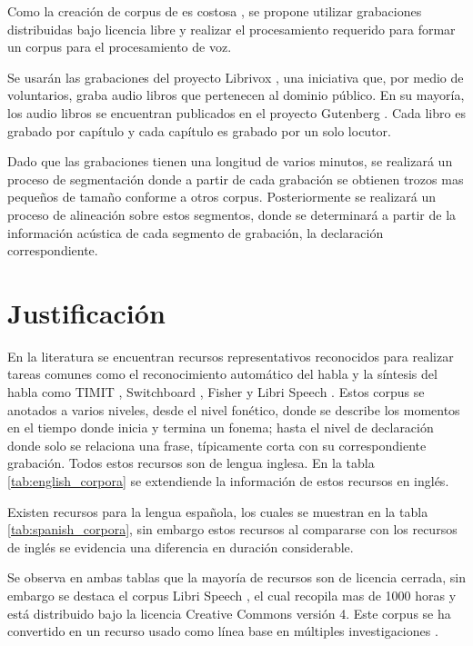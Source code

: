 Como la creación de corpus de es costosa \cite{googleTTSLatinAmericanSpanishCorpus}, se propone utilizar grabaciones distribuidas bajo licencia libre y realizar el procesamiento requerido para formar un corpus para el procesamiento de voz.

Se usarán las grabaciones del proyecto Librivox \cite{LibriVox}, una iniciativa que, por medio de voluntarios, graba audio libros que pertenecen al dominio público. En su mayoría, los audio libros se encuentran publicados en el proyecto Gutenberg \cite{gutenberg}. Cada libro es grabado por capítulo y cada capítulo es grabado por un solo locutor.

Dado que las grabaciones tienen una longitud de varios minutos, se realizará un proceso de segmentación donde a partir de cada grabación se obtienen trozos mas pequeños de tamaño conforme a otros corpus. Posteriormente se realizará un proceso de alineación sobre estos segmentos, donde se determinará a partir de la información acústica de cada segmento de grabación, la declaración correspondiente.


\section{Justificación}

En la literatura se encuentran recursos representativos reconocidos para realizar tareas comunes como el reconocimiento automático del habla y la síntesis del habla como TIMIT \cite{PriceTheRecognition}, Switchboard \cite{Godfrey1992SWITCHBOARD:Development}, Fisher \cite{CieriTheSpeech-to-Text} y Libri Speech \cite{PanayotovLIBRISPEECH:BOOKS}. Estos corpus se anotados a varios niveles, desde el nivel fonético, donde se describe los momentos en el tiempo donde inicia y termina un fonema; hasta el nivel de declaración donde solo se relaciona una frase, típicamente corta con su correspondiente grabación. Todos estos recursos son de lengua inglesa. En la tabla \ref{tab:english_corpora} se extendiende la información de estos recursos en inglés.



Existen recursos para la lengua española, los cuales se muestran en la tabla \ref{tab:spanish_corpora}, sin embargo estos recursos al compararse con los recursos de inglés se evidencia una diferencia en duración considerable.



Se observa en ambas tablas que la mayoría de recursos son de licencia cerrada, sin embargo se destaca el corpus Libri Speech \cite{LIBRISPEECH}, el cual recopila mas de 1000 horas y está distribuido bajo la licencia Creative Commons versión 4. Este corpus se ha convertido en un recurso usado como línea base en múltiples investigaciones \cite{libribox_benchmark1,libribox_benchmark2,libribox_benchmark3}. 


